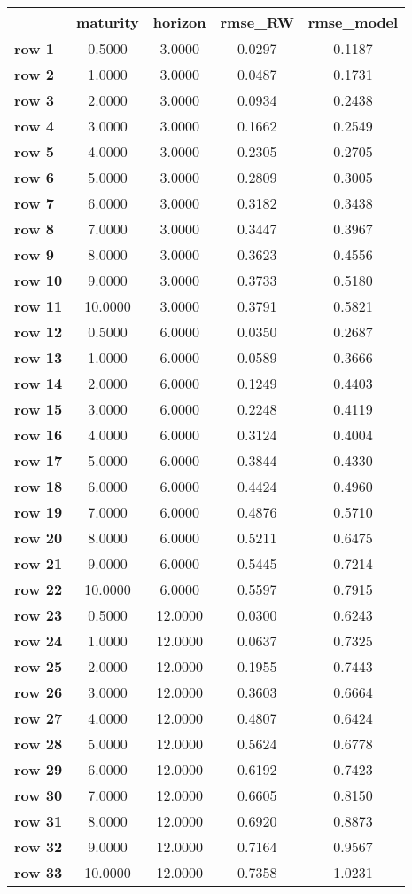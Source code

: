 \begin{tiny}\begin{tabular}{|l|c|c|c|c|}
\hline
&\textbf{maturity}&\textbf{horizon}&\textbf{rmse_RW}&\textbf{rmse_model}\\\hline
\textbf{row 1}&0.5000&3.0000&0.0297&0.1187\\\hline
\textbf{row 2}&1.0000&3.0000&0.0487&0.1731\\\hline
\textbf{row 3}&2.0000&3.0000&0.0934&0.2438\\\hline
\textbf{row 4}&3.0000&3.0000&0.1662&0.2549\\\hline
\textbf{row 5}&4.0000&3.0000&0.2305&0.2705\\\hline
\textbf{row 6}&5.0000&3.0000&0.2809&0.3005\\\hline
\textbf{row 7}&6.0000&3.0000&0.3182&0.3438\\\hline
\textbf{row 8}&7.0000&3.0000&0.3447&0.3967\\\hline
\textbf{row 9}&8.0000&3.0000&0.3623&0.4556\\\hline
\textbf{row 10}&9.0000&3.0000&0.3733&0.5180\\\hline
\textbf{row 11}&10.0000&3.0000&0.3791&0.5821\\\hline
\textbf{row 12}&0.5000&6.0000&0.0350&0.2687\\\hline
\textbf{row 13}&1.0000&6.0000&0.0589&0.3666\\\hline
\textbf{row 14}&2.0000&6.0000&0.1249&0.4403\\\hline
\textbf{row 15}&3.0000&6.0000&0.2248&0.4119\\\hline
\textbf{row 16}&4.0000&6.0000&0.3124&0.4004\\\hline
\textbf{row 17}&5.0000&6.0000&0.3844&0.4330\\\hline
\textbf{row 18}&6.0000&6.0000&0.4424&0.4960\\\hline
\textbf{row 19}&7.0000&6.0000&0.4876&0.5710\\\hline
\textbf{row 20}&8.0000&6.0000&0.5211&0.6475\\\hline
\textbf{row 21}&9.0000&6.0000&0.5445&0.7214\\\hline
\textbf{row 22}&10.0000&6.0000&0.5597&0.7915\\\hline
\textbf{row 23}&0.5000&12.0000&0.0300&0.6243\\\hline
\textbf{row 24}&1.0000&12.0000&0.0637&0.7325\\\hline
\textbf{row 25}&2.0000&12.0000&0.1955&0.7443\\\hline
\textbf{row 26}&3.0000&12.0000&0.3603&0.6664\\\hline
\textbf{row 27}&4.0000&12.0000&0.4807&0.6424\\\hline
\textbf{row 28}&5.0000&12.0000&0.5624&0.6778\\\hline
\textbf{row 29}&6.0000&12.0000&0.6192&0.7423\\\hline
\textbf{row 30}&7.0000&12.0000&0.6605&0.8150\\\hline
\textbf{row 31}&8.0000&12.0000&0.6920&0.8873\\\hline
\textbf{row 32}&9.0000&12.0000&0.7164&0.9567\\\hline
\textbf{row 33}&10.0000&12.0000&0.7358&1.0231\\\hline
\end{tabular}
\end{tiny}